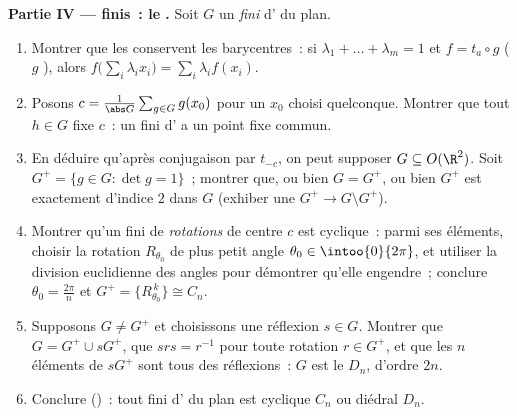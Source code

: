 \begin{problem}
\medskip
\noindent\textbf{Partie IV ---  finis~: le .}
Soit $G$ un  \emph{fini} d' du plan.
\begin{enumerate}[resume]
  \item Montrer que les  conservent les barycentres~: si
        $\lambda_1 + \dots + \lambda_m = 1$ et $f = t_a \circ
        g$ ($g$ ), alors $f\bigl(\sum_i \lambda_i
        x_i\bigr) = \sum_i \lambda_i f(x_i)$.
  \item Posons $c = \frac{1}{\abs G}\sum_{g \in G} g(x_0)$ pour un
        $x_0$ choisi quelconque. Montrer que tout $h \in G$ fixe
        $c$~: un  fini d' a un point fixe commun.
  \item En déduire qu'après conjugaison par $t_{-c}$, on peut
        supposer $G \subseteq O(\R^2)$. Soit $G^{+} = \{g \in G :
        \det g = 1\}$~; montrer que, ou bien $G = G^{+}$, ou bien
        $G^{+}$ est exactement d'indice $2$ dans $G$ (exhiber une
         $G^+ \to G \setminus G^+$).
  \item Montrer qu'un  fini de \emph{rotations} de centre
        $c$ est cyclique~: parmi ses éléments, choisir la rotation
        $R_{\theta_0}$ de plus petit angle $\theta_0 \in
        \intoo{0}{2\pi}$, et utiliser la division euclidienne des
        angles pour démontrer qu'elle engendre~; conclure
        $\theta_0 = \frac{2\pi}n$ et $G^{+} =
        \{R_{\theta_0}^{\,k}\} \cong C_n$.
  \item Supposons $G \neq G^{+}$ et choisissons une réflexion $s
        \in G$. Montrer que $G = G^{+} \cup sG^{+}$, que $s r s =
        r^{-1}$ pour toute rotation $r \in G^{+}$, et que les $n$
        éléments de $sG^{+}$ sont tous des réflexions~: $G$ est le
        \emph{} $D_n$, d'ordre $2n$.
  \item Conclure (\emph{})~: tout
         fini d' du plan est cyclique $C_n$ ou
        diédral $D_n$.
\end{enumerate}


\end{problem}
